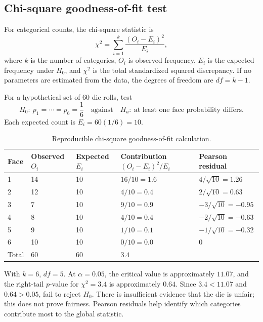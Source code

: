 \documentclass[11pt]{article}
\begin{document}
\subsection{Chi-square goodness-of-fit test}
For categorical counts, the chi-square statistic is
\begin{equation}\label{eq:chisq}
\chi^2=\sum_{i=1}^{k}\frac{(O_i-E_i)^2}{E_i},
\end{equation}
where $k$ is the number of categories, $O_i$ is observed frequency, $E_i$ is
the expected frequency under $H_0$, and $\chi^2$ is the total standardized
squared discrepancy.  If no parameters are estimated from the data, the
degrees of freedom are $df=k-1$.

For a hypothetical set of $60$ die rolls, test
\[
H_0:\ p_1=\cdots=p_6=\frac16
\quad\text{against}\quad
H_a:\ \text{at least one face probability differs}.
\]
Each expected count is $E_i=60(1/6)=10$.

\begin{table}[ht]
\centering
\caption{Reproducible chi-square goodness-of-fit calculation.}\label{tab:chisq-calc}
\begin{tabularx}{0.85\textwidth}{@{}lYYYY@{}}
\toprule
Face & Observed $O_i$ & Expected $E_i$ & Contribution $(O_i-E_i)^2/E_i$ & Pearson residual \\
 & 14 & 10 & $16/10=1.6$ & $4/\sqrt{10}=1.26$ \\
2 & 12 & 10 & $4/10=0.4$ & $2/\sqrt{10}=0.63$ \\
3 & 7 & 10 & $9/10=0.9$ & $-3/\sqrt{10}=-0.95$ \\
4 & 8 & 10 & $4/10=0.4$ & $-2/\sqrt{10}=-0.63$ \\
5 & 9 & 10 & $1/10=0.1$ & $-1/\sqrt{10}=-0.32$ \\
6 & 10 & 10 & $0/10=0.0$ & $0$ \\
\midrule
Total & 60 & 60 & $3.4$ & \\
\bottomrule
\end{tabularx}
\end{table}

With $k=6$, $df=5$.  At $\alpha=0.05$, the critical value is approximately
$11.07$, and the right-tail $p$-value for $\chi^2=3.4$ is approximately
$0.64$.  Since $3.4<11.07$ and $0.64>0.05$, fail to reject $H_0$.  There is
insufficient evidence that the die is unfair; this does not prove fairness.
Pearson residuals help identify which categories contribute most to the
global statistic.
\end{document}
